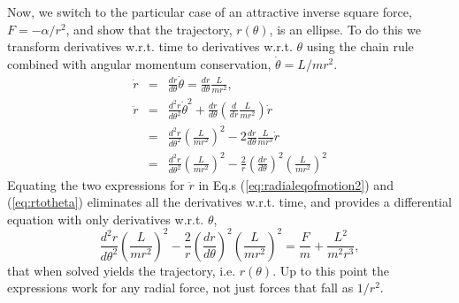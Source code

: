 Now, we switch to the particular case of an attractive inverse square force, $F=-\alpha/r^2$, and show that the trajectory, $r(\theta)$, is an ellipse. To do this we transform derivatives w.r.t. time to derivatives w.r.t. $\theta$ using the chain rule combined with angular momentum conservation, $\dot{\theta}=L/mr^2$.
\begin{eqnarray}
\label{eq:rtotheta}
\dot{r}&=&\frac{dr}{d\theta}\dot{\theta}=\frac{dr}{d\theta}\frac{L}{mr^2},\\
\nonumber
\ddot{r}&=&\frac{d^2r}{d\theta^2}\dot{\theta}^2
+\frac{dr}{d\theta}\left(\frac{d}{dr}\frac{L}{mr^2}\right)\dot{r}\\
\nonumber
&=&\frac{d^2r}{d\theta^2}\left(\frac{L}{mr^2}\right)^2
-2\frac{dr}{d\theta}\frac{L}{mr^3}\dot{r}\\
\nonumber
&=&\frac{d^2r}{d\theta^2}\left(\frac{L}{mr^2}\right)^2
-\frac{2}{r}\left(\frac{dr}{d\theta}\right)^2\left(\frac{L}{mr^2}\right)^2
\end{eqnarray}
Equating the two expressions for $\ddot{r}$ in Eq.s (\ref{eq:radialeqofmotion2}) and (\ref{eq:rtotheta}) eliminates all the derivatives w.r.t. time, and provides a differential equation with only derivatives w.r.t. $\theta$,
\begin{equation}
\label{eq:rdotdot}
\frac{d^2r}{d\theta^2}\left(\frac{L}{mr^2}\right)^2
-\frac{2}{r}\left(\frac{dr}{d\theta}\right)^2\left(\frac{L}{mr^2}\right)^2
=\frac{F}{m}+\frac{L^2}{m^2r^3},
\end{equation}
that when solved yields the trajectory, i.e. $r(\theta)$. Up to this point the expressions work for any radial force, not just forces that fall as $1/r^2$.

